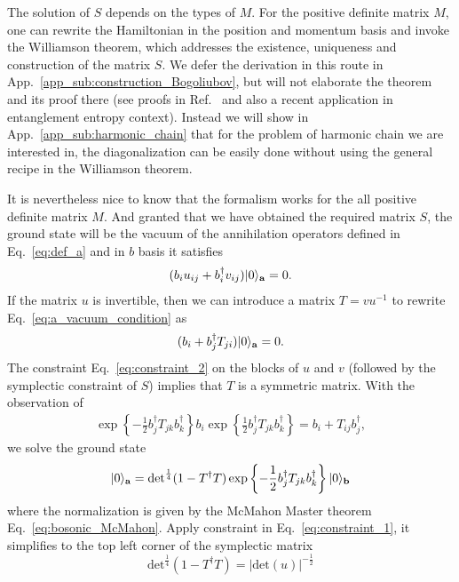 The solution of $S$ depends on the types of $M$. For the positive definite matrix $M$, one can rewrite the Hamiltonian in the position and momentum basis and invoke the Williamson theorem\cite{arnold_mathematical_2010}, which addresses the existence, uniqueness and construction of the matrix $S$. We defer the derivation in this route in App.~\ref{app_sub:construction_Bogoliubov}, but will not elaborate the theorem and its proof there (see proofs in Ref.~ and also a recent application in entanglement entropy context\cite{coser_contour_2017}). Instead we will show in App.~\ref{app_sub:harmonic_chain} that for the problem of harmonic chain we are interested in, the diagonalization can be easily done without using the general recipe in the Williamson theorem. 

It is nevertheless nice to know that the formalism works for the all positive definite matrix $M$. And granted that we have obtained the required matrix $S$, the ground state will be the vacuum of the annihilation operators defined in Eq.~\eqref{eq:def_a} and in $b$ basis it satisfies
\begin{equation}\begin{aligned}
\label{eq:a_vacuum_condition}
(b_iu_{ij}+b_i^\dagger v_{ij})|0\rangle_{{\bf a}}=0.
\end{aligned}\end{equation}
If the matrix $u$ is invertible, then we can introduce a matrix $T=vu^{-1}$ to rewrite Eq.~\eqref{eq:a_vacuum_condition} as
\begin{equation}\begin{aligned}
(b_i+b_j^\dagger T_{ji})|0\rangle_{{\bf a}}=0. 
\end{aligned}\end{equation}
The constraint Eq.~\eqref{eq:constraint_2} on the blocks of $u$ and $v$ (followed by the symplectic constraint of $S$) implies that $T$ is a symmetric matrix. With the observation of 
\begin{equation}\begin{aligned}
\exp\left\{-\frac{1}{2}b_j^\dagger T_{jk}b_k^\dagger\right\}b_i\exp\left\{\frac{1}{2}b_j^\dagger T_{jk}b_k^\dagger\right\}=b_i+T_{ij}b^\dagger_j,
\end{aligned}\end{equation}
we solve the ground state
\begin{equation}\begin{aligned}
\label{eq:boson_BCS_gnd}
|0\rangle_{{\bf a}}&=\text{det}^{\frac{1}{4}}(1-T^\dagger T)\exp\left\{-\frac{1}{2}b_j^\dagger T_{jk}b_k^\dagger\right\}|0\rangle_{\bf b}\\
\end{aligned}\end{equation}
where the normalization is given by the McMahon Master theorem Eq.~\ref{eq:bosonic_McMahon}. Apply constraint in Eq.~\eqref{eq:constraint_1}, it simplifies to the top left corner of the symplectic matrix
\begin{equation}
\text{det}^{\frac{1}{4}}(1-T^\dagger T) =|\text{det}(u)|^{-\frac{1}{2}}
\end{equation}

